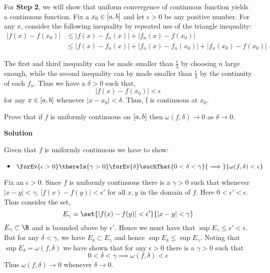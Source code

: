 \documentclass[11pt]{amstext-l}
\newcommand{\solution}{\textbf{\large Solution}}
\begin{document}
\begin{homeworkProblem}[7]
    \vspace{0.5in}

    For \textbf{Step 2}, we will show that uniform convergence of continuous function yields a 
    continuous function. Fix a $x_0 \in \interval{a}{b}$ and let $\epsilon > 0$ be any positive 
    number. For any $x$, consider the following inequality by repeated use of the triangle
    inequality:
    \begin{align*}
	\lvert f(x) - f(x_0) \rvert &\leq \lvert f(x) - f_n(x)\rvert + \lvert f_n(x) - f(x_0) \rvert \\
	&\leq \lvert f(x) - f_n(x) \rvert + \lvert f_n(x) - f_n(x_0)\rvert + \lvert f_n(x_0) -
	f(x_0)\rvert 
    \end{align*}

    The first and third inequality can be made smaller than $\frac{\epsilon}{3}$ by choosing $n$
    large enough, while the second inequality can by made smaller than $\frac{\epsilon}{3}$ by the
    continuity of each $f_n$. Thus we have a $\delta > 0$ such that,
    \[ \lvert f(x) - f(x_0) \rvert  < \epsilon\]
    for any $x \in \interval{a}{b}$ whenever $\lvert x - x_0 \rvert < \delta$. Thus,
    f is continuous at $x_0$. 
\end{homeworkProblem}


\pagebreak

\begin{homeworkProblem}[8]
    Prove that if $f$ is uniformly continuous on $\interval{a}{b}$ then $\omega(f,\delta) \to 0$ as
    $\delta \to 0$.

    \solution{}

    Given that $f$ is uniformly continuous we have to show:
    \begin{itemize}
	\item $\forEv{\epsilon > 0 }\thereIs{\gamma > 0 }\forEv{\delta}
	    \suchThat{0 < \delta < \gamma}{\implies}{\omega(f,\delta) < \epsilon}$	

    \end{itemize}
    Fix an $\epsilon > 0$. Since $f$ is uniformly continuous there is a $\gamma > 0$ such that
    whenever $\lvert x - y \rvert < \gamma$, $\lvert f(x) - f(y)\rvert < {\epsilon}'$ for all $x,y$ in the
    domain of $f$. Here $0 < \epsilon ' < \epsilon$. Thus consider the set,
    \[ E_{\gamma} = \set{\lvert f(x) - f(y) \rvert < {\epsilon}'}{\lvert x - y\rvert < \gamma} \]
    $E_{\gamma} \subset \R$ and is bounded above by ${\epsilon}'$. Hence we must have that 
    $\sup{E_{\gamma}} \leq \epsilon ' < \epsilon$. But for any $\delta < \gamma$, we have
    $E_{\delta} \subset E_{\gamma}$ and hence $\sup E_{\delta} \leq \sup E_{\gamma}$. Noting that
    $\sup{E_{\delta}} = \omega(f,\delta)$ we have shown that for any $\epsilon > 0$ there is a
    $\gamma > 0$ such that
    \[ 0 < \delta < \gamma \implies \omega(f,\delta) < \epsilon \]
    Thus $\omega(f,\delta) \to 0$ whenever $\delta \to 0$.
 

\end{homeworkProblem}
\end{document}

